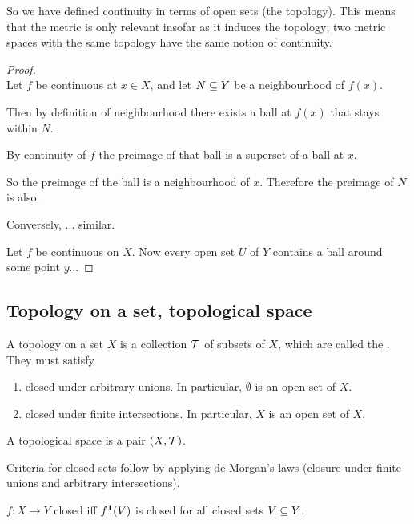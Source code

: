 \begin{remark*}
  So we have defined continuity in terms of open sets (the topology). This means that the metric is
  only relevant insofar as it induces the topology; two metric spaces with the same topology have
  the same notion of continuity.
\end{remark*}

\begin{proof}~\\
  Let $f$ be continuous at $x \in X$, and let $N \subseteq Y$ be a neighbourhood of $f(x)$.

  Then by definition of neighbourhood there exists a ball at $f(x)$ that stays within $N$.

  By continuity of $f$ the preimage of that ball is a superset of a ball at $x$.

  So the preimage of the ball is a neighbourhood of $x$. Therefore the preimage of $N$ is also.

  Conversely, ... similar.

  Let $f$ be continuous on $X$. Now every open set $U$ of $Y$ contains a ball around some point $y$...
\end{proof}

\subsection{Topology on a set, topological space}
\begin{definition}
  A topology on a set $X$ is a collection $\mathcal T$ of subsets of $X$, which are called the . They must
  satisfy
  \begin{enumerate}
  \item closed under arbitrary unions. In particular, $\emptyset$ is an open set of $X$.
  \item closed under finite intersections. In particular, $X$ is an open set of $X$.
  \end{enumerate}
  A topological space is a pair $(X, \mathcal T)$.
\end{definition}

\begin{remark*}
  Criteria for closed sets follow by applying de Morgan's laws (closure under finite unions and
  arbitrary intersections).

  $f:X\to Y$ closed iff $f^{\mathbf 1}(V)$ is closed for all closed sets $V \subseteq Y$.
\end{remark*}

